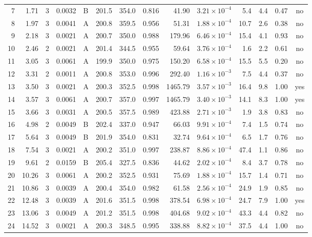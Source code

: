 \begin{landscape}
\begin{longtable}{rrrrlrrrrrrrrc}
7 & 1.71 & 3 & 0.0032 & B & 201.5 & 354.0 & 0.816 & 41.90 & $3.21\times10^{-4}$ & 5.4 & 4.4 & 0.47 & no \\
8 & 1.97 & 3 & 0.0041 & A & 200.8 & 359.5 & 0.956 & 51.31 & $1.88\times10^{-4}$ & 10.7 & 2.6 & 0.38 & no \\
9 & 2.18 & 3 & 0.0021 & A & 200.7 & 350.0 & 0.988 & 179.96 & $6.46\times10^{-4}$ & 15.4 & 4.1 & 0.93 & no \\
10 & 2.46 & 2 & 0.0021 & A & 201.4 & 344.5 & 0.955 & 59.64 & $3.76\times10^{-4}$ & 1.6 & 2.2 & 0.61 & no \\
11 & 3.05 & 3 & 0.0061 & A & 199.9 & 350.0 & 0.975 & 150.20 & $6.58\times10^{-4}$ & 15.5 & 5.5 & 0.20 & no \\
12 & 3.31 & 2 & 0.0011 & A & 200.8 & 353.0 & 0.996 & 292.40 & $1.16\times10^{-3}$ & 7.5 & 4.4 & 0.37 & no \\
13 & 3.50 & 3 & 0.0021 & A & 200.3 & 352.5 & 0.998 & 1465.79 & $3.57\times10^{-3}$ & 16.4 & 9.8 & 1.00 & yes \\
14 & 3.57 & 3 & 0.0061 & A & 200.7 & 357.0 & 0.997 & 1465.79 & $3.40\times10^{-3}$ & 14.1 & 8.3 & 1.00 & yes \\
15 & 3.66 & 3 & 0.0031 & A & 200.5 & 357.5 & 0.989 & 423.88 & $2.71\times10^{-3}$ & 1.9 & 3.8 & 0.83 & no \\
16 & 4.98 & 2 & 0.0049 & B & 202.4 & 337.0 & 0.947 & 66.03 & $9.91\times10^{-4}$ & 7.4 & 1.5 & 0.74 & no \\
17 & 5.64 & 3 & 0.0049 & B & 201.9 & 354.0 & 0.831 & 32.74 & $9.64\times10^{-4}$ & 6.5 & 1.7 & 0.76 & no \\
18 & 7.54 & 3 & 0.0021 & A & 200.2 & 351.0 & 0.997 & 238.87 & $8.86\times10^{-4}$ & 47.4 & 1.1 & 0.86 & no \\
19 & 9.61 & 2 & 0.0159 & B & 205.4 & 327.5 & 0.836 & 44.62 & $2.02\times10^{-4}$ & 8.4 & 3.7 & 0.78 & no \\
20 & 10.26 & 3 & 0.0061 & A & 200.2 & 352.5 & 0.931 & 75.69 & $1.88\times10^{-4}$ & 15.7 & 1.4 & 0.71 & no \\
21 & 10.86 & 3 & 0.0039 & A & 200.4 & 354.0 & 0.982 & 61.58 & $2.56\times10^{-4}$ & 24.9 & 1.9 & 0.85 & no \\
22 & 12.48 & 3 & 0.0039 & A & 201.6 & 351.5 & 0.998 & 378.54 & $6.98\times10^{-4}$ & 24.7 & 7.9 & 1.00 & yes \\
23 & 13.06 & 3 & 0.0049 & A & 201.2 & 351.5 & 0.998 & 404.68 & $9.02\times10^{-4}$ & 43.3 & 4.4 & 0.82 & no \\
24 & 14.52 & 3 & 0.0021 & A & 200.3 & 348.5 & 0.995 & 338.88 & $8.82\times10^{-4}$ & 37.5 & 4.4 & 1.00 & no \\

\end{longtable}
\end{landscape}
